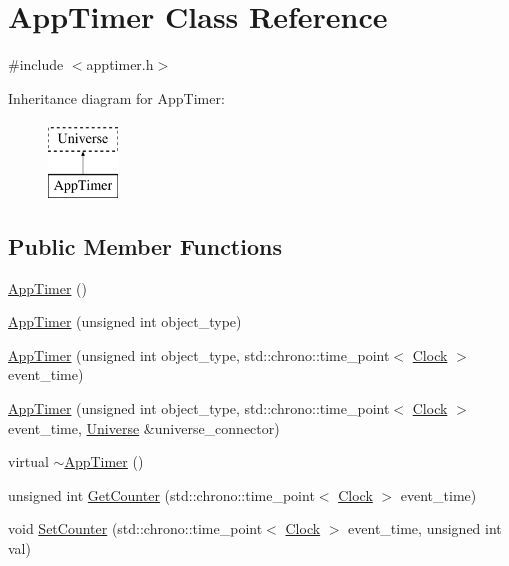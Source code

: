 \hypertarget{classAppTimer}{}\section{App\+Timer Class Reference}
\label{classAppTimer}


{\ttfamily \#include $<$apptimer.\+h$>$}

Inheritance diagram for App\+Timer\+:\begin{figure}[H]
\begin{center}
\leavevmode
\includegraphics[height=2.000000cm]{classAppTimer}
\end{center}
\end{figure}
\subsection*{Public Member Functions}
\begin{DoxyCompactItemize}
\item 
\mbox{\hyperlink{classAppTimer_a59bf4eccdc9a3e16745b2cf9a122f935}{App\+Timer}} ()
\item 
\mbox{\hyperlink{classAppTimer_a06df15e33135f60f661c231e067951f3}{App\+Timer}} (unsigned int object\+\_\+type)
\item 
\mbox{\hyperlink{classAppTimer_a192075895ca575e9acb2663f3ebcecd6}{App\+Timer}} (unsigned int object\+\_\+type, std\+::chrono\+::time\+\_\+point$<$ \mbox{\hyperlink{universe_8h_a0ef8d951d1ca5ab3cfaf7ab4c7a6fd80}{Clock}} $>$ event\+\_\+time)
\item 
\mbox{\hyperlink{classAppTimer_af0836d131aa78b6812930199a5c7f9bd}{App\+Timer}} (unsigned int object\+\_\+type, std\+::chrono\+::time\+\_\+point$<$ \mbox{\hyperlink{universe_8h_a0ef8d951d1ca5ab3cfaf7ab4c7a6fd80}{Clock}} $>$ event\+\_\+time, \mbox{\hyperlink{classUniverse}{Universe}} \&universe\+\_\+connector)
\item 
virtual \mbox{\hyperlink{classAppTimer_a5ef0c072a0591cf5a3bcc07edbd3577f}{$\sim$\+App\+Timer}} ()
\item 
unsigned int \mbox{\hyperlink{classAppTimer_ab9bb2b5f283b02d6d2292e064ddbd2ab}{Get\+Counter}} (std\+::chrono\+::time\+\_\+point$<$ \mbox{\hyperlink{universe_8h_a0ef8d951d1ca5ab3cfaf7ab4c7a6fd80}{Clock}} $>$ event\+\_\+time)
\item 
void \mbox{\hyperlink{classAppTimer_a77d5d447d6b136a35304b0571a166ddc}{Set\+Counter}} (std\+::chrono\+::time\+\_\+point$<$ \mbox{\hyperlink{universe_8h_a0ef8d951d1ca5ab3cfaf7ab4c7a6fd80}{Clock}} $>$ event\+\_\+time, unsigned int val)
\end{DoxyCompactItemize}
